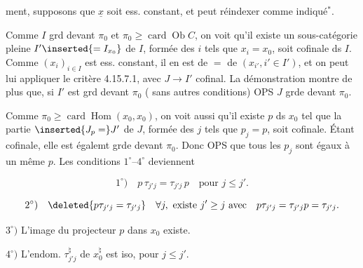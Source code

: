 %
%
ment, supposons que $\underline{x}$ soit ess. constant, \deleted{\unsure{$\exists$|$\forall$}}  et     peut réindexer comme indiqué$^{*}$.


Comme $I$ grd devant $\pi_0$ et $\pi_0\geq\operatorname{card}\operatorname{Ob} C$, on voit qu'il existe un  sous-catégorie pleine $I'\inserted{=I_{x_0}}$ de $I$,  formée des $i$ tels que $x_i=x_0$, soit cofinale ds $I$.  Comme $(x_i)_{i\in I}$ est ess. constant, il en est de $=$ de $(x_{i'},i'\in I')$, et on peut lui appliquer le critère 4.15.7.1, avec $J\to I'$ cofinal. La démonstration montre de plus que, si $I'$ est grd devant $\pi_0$ ( sans autres conditions) OPS $J$ grde devant $\pi_0$. 


Comme $\pi_0\geq\operatorname{card}\operatorname{Hom}(x_0,x_0)$, on voit aussi qu'il existe   $p$ ds $x_0$ tel que la partie  $\inserted{J_p=}J'$ de $J$,  formée des $j$ tels que $p_j=p$, soit cofinale. Étant cofinale, elle est égalemt grde devant $\pi_0$. Donc OPS que tous les $p_j$ sont égaux à un même $p$. Les conditions $1^\circ$--$4^\circ$ deviennent

\[1^\circ)\quad p\,\tau_{j'j}=\tau_{j'j}\,p\quad\text{pour }j\leq j'.\]

\[2^\circ)\quad\deleted{p\tau_{j'j}=\tau_{j'j}}\quad\forall j,\ \text{existe }j'\geq j\ \text{avec}\quad p\tau_{j'j}=\tau_{j'j}p=\tau_{j'j}.\]

$3^\circ)$ \deleted{\unsure{$\forall$}} L'image  du projecteur $p$ dans $x_0$ existe.

$4^\circ)$ L'endom. $\tau_{j'j}^\natural$ de $x_0^\natural$ est iso, pour $j\leq j'$.
